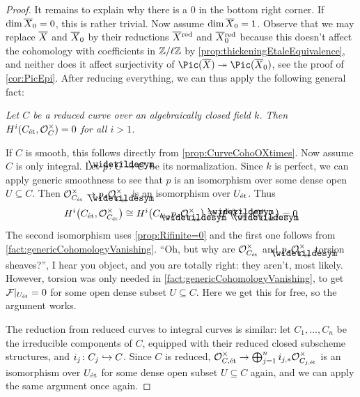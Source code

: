 \documentclass[a4paper, 10pt, oneside, DIV=9, chapterprefix=true, numbers=enddot, bibliography=totoc]{scrbook}
\begin{document}
\begin{proof}
	 It remains to explain why there is a $0$ in the bottom right corner. If $\dim \ov{X}_0=0$, this is rather trivial. Now assume $\dim \ov{X}_0=1$. Observe that we may replace $\ov{X}$ and $\ov{X}_0$ by their reductions $\ov{X}^\red$ and $\ov{X}_0^\red$ because this doesn't affect the cohomology with coefficients in $\mathbb{Z}/\ell\mathbb{Z}$ by \cref{prop:thickeningEtaleEquivalence}, and neither does it affect surjectivity of $\Pic(\ov{X})\epimorphism \Pic(\ov{X}_0)$, see the proof of \cref{cor:PicEpi}. After reducing everything, we can thus apply the following general fact:
	 \begin{alphanumerate}
	 	\item[\itememph{*}] \itshape Let $C$ be a reduced curve over an algebraically closed field $k$. Then $H^i(C_{\mathrm{\acute{e}t}},\mathcal{O}_C^\times)=0$ for all $i>1$.
	 \end{alphanumerate}
 	If $C$ is smooth, this follows directly from \cref{prop:CurveCohoOXtimes}. Now assume $C$ is only integral. Let $p\colon \snake{C}\morphism C$ be its normalization. Since $k$ is perfect, we can apply generic smoothness to see that $p$ is an isomorphism over some dense open $U\subseteq C$. Then $\Oo_{C_\et}^\times\morphism p_*\Oo_{\snake{C}_\et}^\times$ is an isomorphism over $U_{\mathrm{\acute{e}t}}$. Thus
 	\begin{equation*}
 		H^i\big(C_\et,\Oo_{C_\et}^\times\big)\cong H^i\big(C_\et,p_*\Oo_{\snake{C}_\et}^\times\big) \cong H^i\big(\snake{C}_\et,\Oo_{\snake{C},\et}^\times\big)= 0
 	\end{equation*}
 	The second isomorphism uses \cref{prop:Rifinite=0} and the first one follows from \cref{fact:genericCohomologyVanishing}. \enquote{Oh, but why are $\mathcal{O}_{C_{\mathrm{\acute{e}t}}}^\times$ and $p_*\Oo_{\snake{C}_\et}^\times$ torsion sheaves?}, I hear you object, and you are totally right: they aren't, most likely. However, torsion was only needed in \cref{fact:genericCohomologyVanishing}, to get $\mathcal{F}|_{U_{\mathrm{\acute{e}t}}}=0$ for some open dense subset $U\subseteq C$. Here we get this for free, so the argument works.
 	
 	The reduction from reduced curves to integral curves is similar: let $C_1,\dotsc,C_n$ be the irreducible components of $C$, equipped with their reduced closed subscheme structures, and $i_j\colon C_j\monomorphism C$. Since $C$ is reduced, $\Oo_{C,\et}^\times\morphism \bigoplus_{j=1}^ni_{j,*}\Oo_{C_{j,\et}}^\times$ is an isomorphism over $U_{\mathrm{\acute{e}t}}$ for some dense open subset $U\subseteq C$ again, and we can apply the same argument once again.
\end{proof}
\end{document}
